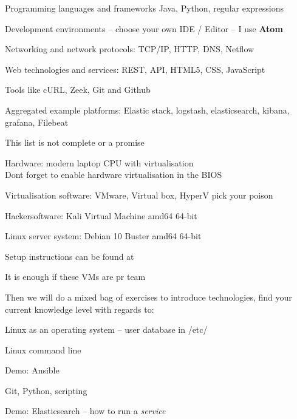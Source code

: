 \documentclass[Screen16to9,17pt]{foils}
\begin{document}
\begin{list2}
\item Programming languages and frameworks Java, Python, regular expressions
\item Development environments -- choose your own IDE / Editor -- I use {\bf Atom}
\item Networking and network protocols: TCP/IP, HTTP, DNS, Netflow
\item Web technologies and services: REST, API, HTML5, CSS, JavaScript
\item Tools like cURL, Zeek, Git and Github
\item Aggregated example platforms: Elastic stack, logstash, elasticsearch, kibana, grafana, Filebeat
\end{list2}

\centerline{This list is not complete or a promise }




\begin{list2}
\item Hardware: modern laptop CPU with virtualisation\\
Dont forget to enable hardware virtualisation in the BIOS
\item Virtualisation software: VMware, Virtual box, HyperV pick your poison
\item Hackersoftware: Kali Virtual Machine amd64 64-bit 
\item Linux server system: Debian 10 Buster amd64 64-bit 
\item Setup instructions can be found at 
\end{list2}

\centerline{It is enough if these VMs are pr team}

Then we will do a mixed bag of exercises to introduce technologies, find your current knowledge level with regards to:

\begin{list2}
\item Linux as an operating system -- user database in /etc/
\item Linux command line
\item Demo: Ansible
\item Git, Python, scripting
\item Demo: Elasticsearch -- how to run a \emph{service}
\end{list2}
\end{document}
